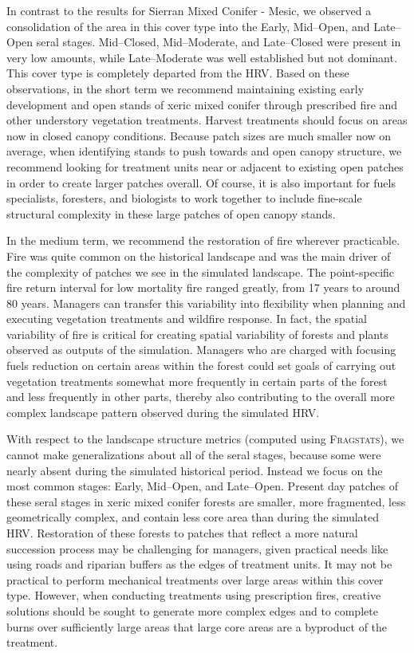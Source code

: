 In contrast to the results for Sierran Mixed Conifer - Mesic, we observed a consolidation of the area in this cover type into the Early, Mid--Open, and Late--Open seral stages. Mid--Closed, Mid--Moderate, and Late--Closed were present in very low amounts, while Late--Moderate was well established but not dominant. This cover type is completely departed from the HRV. Based on these observations, in the short term we recommend maintaining existing early development and open stands of xeric mixed conifer through prescribed fire and other understory vegetation treatments. Harvest treatments should focus on areas now in closed canopy conditions. Because patch sizes are much smaller now on average, when identifying stands to push towards and open canopy structure, we recommend looking for treatment units near or adjacent to existing open patches in order to create larger patches overall. Of course, it is also important for fuels specialists, foresters, and biologists to work together to include fine-scale structural complexity in these large patches of open canopy stands.

In the medium term, we recommend the restoration of fire wherever practicable. Fire was quite common on the historical landscape and was the main driver of the complexity of patches we see in the simulated landscape. The point-specific fire return interval for low mortality fire ranged greatly, from 17 years to around 80 years. Managers can transfer this variability into flexibility when planning and executing vegetation treatments and wildfire response. In fact, the spatial variability of fire is critical for creating spatial variability of forests and plants observed as outputs of the simulation. Managers who are charged with focusing fuels reduction on certain areas within the forest could set goals of carrying out vegetation treatments somewhat more frequently in certain parts of the forest and less frequently in other parts, thereby also contributing to the overall more complex landscape pattern observed during the simulated HRV. 

With respect to the landscape structure metrics (computed using \textsc{Fragstats}), we cannot make generalizations about all of the seral stages, because some were nearly absent during the simulated historical period. Instead we focus on the most common stages: Early, Mid--Open, and Late--Open. Present day patches of these seral stages in xeric mixed conifer forests are smaller, more fragmented, less geometrically complex, and contain less core area than during the simulated HRV. Restoration of these forests to patches that reflect a more natural succession process may be challenging for managers, given practical needs like using roads and riparian buffers as the edges of treatment units. It may not be practical to perform mechanical treatments over large areas within this cover type. However, when conducting treatments using prescription fires, creative solutions should be sought to generate more complex edges and to complete burns over sufficiently large areas that large core areas are a byproduct of the treatment.










